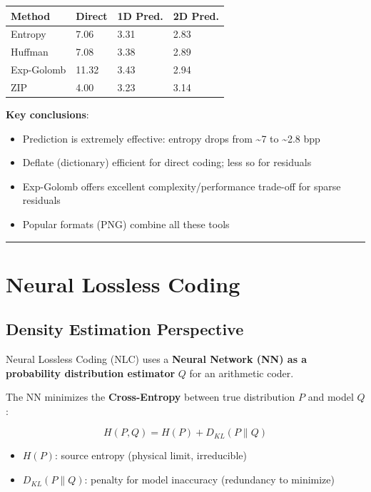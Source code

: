 \begin{center}
\begin{tabular}{|l|l|l|l|}
\hline
\textbf{Method} & \textbf{Direct} & \textbf{1D Pred.} & \textbf{2D Pred.} \\ \hline
Entropy & 7.06 & 3.31 & 2.83 \\ \hline
Huffman & 7.08 & 3.38 & 2.89 \\ \hline
Exp-Golomb & 11.32 & 3.43 & 2.94 \\ \hline
ZIP & 4.00 & 3.23 & 3.14 \\ \hline
\end{tabular}
\end{center}

\textbf{Key conclusions}:
\begin{itemize}
\item Prediction is extremely effective: entropy drops from \textasciitilde{}7 to \textasciitilde{}2.8 bpp
\item Deflate (dictionary) efficient for direct coding; less so for residuals
\item Exp-Golomb offers excellent complexity/performance trade-off for sparse residuals
\item Popular formats (PNG) combine all these tools
\end{itemize}

\bigskip\hrule\bigskip

\section{Neural Lossless Coding}

\subsection{Density Estimation Perspective}

Neural Lossless Coding (NLC) uses a \textbf{Neural Network (NN) as a probability distribution estimator} $Q$ for an arithmetic coder.

The NN minimizes the \textbf{Cross-Entropy} between true distribution $P$ and model $Q$:

\[
H(P, Q) = H(P) + D_{KL}(P \parallel Q)
\]

\begin{itemize}
\item $H(P)$: source entropy (physical limit, irreducible)
\item $D_{KL}(P \parallel Q)$: penalty for model inaccuracy (redundancy to minimize)
\end{itemize}

